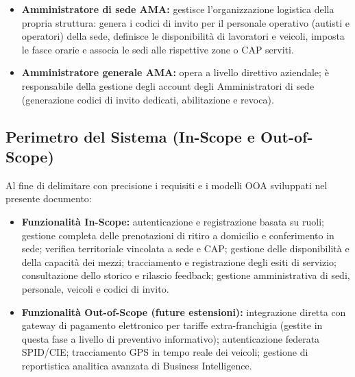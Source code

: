 \begin{itemize}[leftmargin=*]
    \item \textbf{Amministratore di sede AMA:} gestisce l'organizzazione logistica della propria struttura: genera i codici di invito per il personale operativo (autisti e operatori) della sede, definisce le disponibilità di lavoratori e veicoli, imposta le fasce orarie e associa le sedi alle rispettive zone o CAP serviti.
    
    \item \textbf{Amministratore generale AMA:} opera a livello direttivo aziendale; è responsabile della gestione degli account degli Amministratori di sede (generazione codici di invito dedicati, abilitazione e revoca).
\end{itemize}

\subsection{Perimetro del Sistema (In-Scope e Out-of-Scope)}
Al fine di delimitare con precisione i requisiti e i modelli OOA sviluppati nel presente documento:
\begin{itemize}[leftmargin=*]
    \item \textbf{Funzionalità In-Scope:} autenticazione e registrazione basata su ruoli; gestione completa delle prenotazioni di ritiro a domicilio e conferimento in sede; verifica territoriale vincolata a sede e CAP; gestione delle disponibilità e della capacità dei mezzi; tracciamento e registrazione degli esiti di servizio; consultazione dello storico e rilascio feedback; gestione amministrativa di sedi, personale, veicoli e codici di invito.
    \item \textbf{Funzionalità Out-of-Scope (future estensioni):} integrazione diretta con gateway di pagamento elettronico per tariffe extra-franchigia (gestite in questa fase a livello di preventivo informativo); autenticazione federata SPID/CIE; tracciamento GPS in tempo reale dei veicoli; gestione di reportistica analitica avanzata di Business Intelligence.
\end{itemize}
